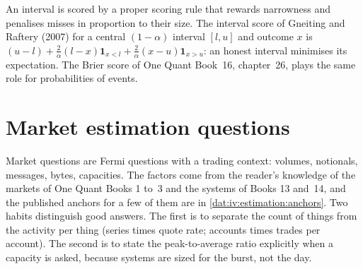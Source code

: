 \begin{omfigure}

\label{fig:iv:estimation:calib}
\end{omfigure}

An interval is scored by a proper scoring rule that rewards narrowness and penalises misses in proportion to
their size. The interval score of Gneiting and Raftery (2007) for a central $(1-\alpha)$ interval $[l, u]$ and
outcome $x$ is $(u - l) + \tfrac2\alpha(l - x)\mathbf 1_{x<l} + \tfrac2\alpha(x - u)\mathbf 1_{x>u}$: an
honest interval minimises its expectation. The Brier score of One Quant Book~16, chapter~26, plays the same role
for probabilities of events.

\section{Market estimation questions}

Market questions are Fermi questions with a trading context: volumes, notionals, messages, bytes, capacities.
The factors come from the reader's knowledge of the markets of One Quant Books 1 to~3 and the systems of Books
13 and~14, and the published anchors for a few of them are in \cref{dat:iv:estimation:anchors}. Two habits
distinguish good answers. The first is to separate the count of things from the activity per thing (series
times quote rate; accounts times trades per account). The second is to state the peak-to-average ratio
explicitly when a capacity is asked, because systems are sized for the burst, not the day.

